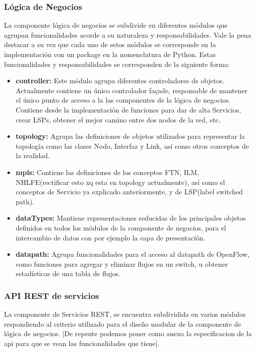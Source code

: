 \subsubsection{Lógica de Negocios}
La componente lógica de negocios se subdivide en diferentes m\'odulos que agrupan funcionalidades acorde a su naturaleza y responsabilidades. Vale la pena destacar a su vez que cada uno de estos m\'odulos se corresponde en la implementaci\'on con un package en la nomenclatura de Python. Estas funcionalidades y responsabilidades se corresponden de la siguiente forma:

\begin{itemize}
\item \textbf{controller:} Este m\'odulo agrupa diferentes controladores de objetos. Actualmente contiene un \'unico controlador façade, responsable de mantener el \'unico punto de acceso a la las componentes de la l\'ogica de negocios. Contiene desde la implementaci\'on de funciones para dar de alta Servicios, crear LSPs, obtener el mejor camino entre dos nodos de la red, etc.

\item \textbf{topology:} Agrupa las definiciones de objetos utilizados para representar la topolog\'ia como las clases Nodo, Interfaz y Link, así como otros conceptos de la realidad.
 
\item \textbf{mpls:} Contiene las definiciones de los conceptos FTN, ILM, NHLFE(rectificar esto xq esta en topology actualmente), as\'i como el conceptos de Servicio ya explicado anteriormente, y de LSP(label switched path).

\item \textbf{dataTypes:} Mantiene representaciones reducidas de los principales objetos definidos en todos los m\'odulos de la componente de negocios, para el intercambio de datos con por ejemplo la capa de presentaci\'on. 

\item \textbf{datapath:} Agrupa funcionalidades para el acceso al datapath de OpenFlow, como funciones para agregar y eliminar flujos en un switch, u obtener estad\'isticas de una tabla de flujos.
\end{itemize} 

\subsubsection{API REST de servicios}
La componente de Servicios REST, se encuentra subdividida en varios m\'odulos respondiendo al criterio utilizado para el dise\~no modular de la componente de l\'ogica de negocios. [De repente podemos poner como anexo la especificacion de la api para que se vean las funcionalidades que tiene].

